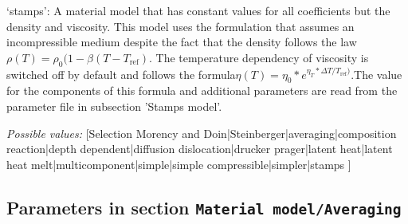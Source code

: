 \begin{itemize}
`stamps': A material model that has constant values for all coefficients but the density and viscosity. This model uses the formulation that assumes an incompressible medium despite the fact that the density follows the law $\rho(T)=\rho_0(1-\beta(T-T_{\text{ref}})$. The temperature dependency of viscosity is  switched off by default and follows the formula$\eta(T)=\eta_0*e^{\eta_T*\Delta T / T_{\text{ref}})}$.The value for the components of this formula and additional parameters are read from the parameter file in subsection 'Stamps model'.


{\it Possible values:} [Selection Morency and Doin|Steinberger|averaging|composition reaction|depth dependent|diffusion dislocation|drucker prager|latent heat|latent heat melt|multicomponent|simple|simple compressible|simpler|stamps ]
\end{itemize}



\subsection{Parameters in section \tt Material model/Averaging}
\label{parameters:Material_20model/Averaging}

